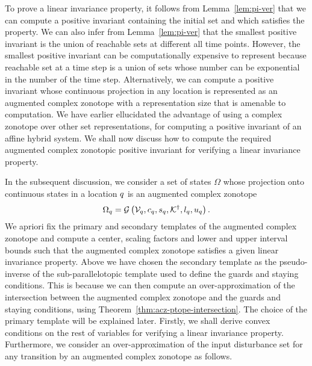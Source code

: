 To prove a linear invariance property, it follows from
Lemma~\ref{lem:pi-ver} that we can compute a positive invariant
containing the initial set and which satisfies the property.  We can
also infer from Lemma~\ref{lem:pi-ver} that the smallest positive
invariant is the union of reachable sets at different all time points.
However, the smallest positive invariant can be computationally
expensive to represent because reachable set at a time step is a union
of sets whose number can be exponential in the number of the time
step.  Alternatively, we can compute a positive invariant whose
continuous projection in any location is represented as an augmented
complex zonotope with a representation size that is amenable to
computation.  We have earlier ellucidated the advantage of using a
complex zonotope over other set representations, for computing a
positive invariant of an affine hybrid system.  We shall now discuss
how to compute the required augmented complex zonotopic positive
invariant for verifying a linear invariance property.

In the subsequent discussion, we consider a set of states $\Omega$ whose
projection onto continuous states in a location $q$ is an augmented
complex zonotope
%
\[
\Omega_q=\mathcal{G}\left(\mathcal{V}_q,c_q,s_q,{\mathcal{K}}^\dagger,l_q,u_q\right).
\]
%
We apriori fix the primary and secondary templates of the augmented
complex zonotope and compute a center, scaling factors and lower and
upper interval bounds such that the augmented complex zonotope
satisfies a given linear invariance property.  Above we have chosen
the secondary template as the pseudo-inverse of the sub-parallelotopic
template used to define the guards and staying conditions.  This is
because we can then compute an over-approximation of the intersection
between the augmented complex zonotope and the guards and staying
conditions, using Theorem~\ref{thm:acz-ptope-intersection}.  The choice
of the primary template will be explained later.  Firstly, we shall
derive convex conditions on the rest of variables for verifying a
linear invariance property.  Furthermore, we consider an
over-approximation of the input
disturbance set for any transition by an
augmented complex zonotope as follows.

